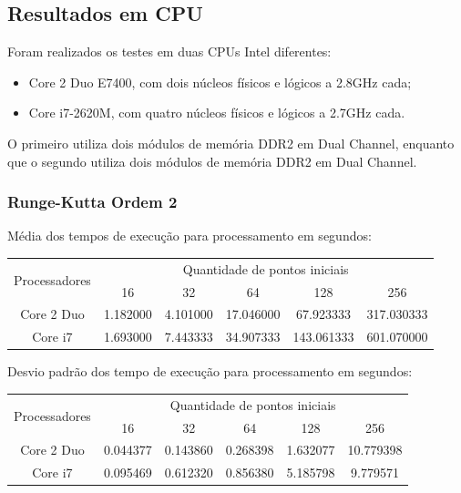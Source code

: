   \subsection{Resultados em CPU}
  Foram realizados os testes em duas CPUs Intel diferentes:
  \begin{itemize}
    \item Core 2 Duo E7400, com dois núcleos físicos e lógicos a 2.8GHz cada;
    \item Core i7-2620M, com quatro núcleos físicos e lógicos a 2.7GHz cada.
  \end{itemize}
  
  O primeiro utiliza dois módulos de memória DDR2 em Dual Channel, enquanto que o segundo utiliza dois módulos de memória DDR2 em Dual Channel.
    \subsubsection{Runge-Kutta Ordem 2}
    Média dos tempos de execução para processamento em segundos:\\
    \begin{tabular}{| c | c | c | c | c | c |}
      \hline
      \multirow{2}{*}{Processadores}& \multicolumn{5}{|c|}{Quantidade de pontos iniciais} \\ \cline{2-6}
      & 16 & 32 & 64 & 128 & 256 \\ \hline
      Core 2 Duo & 1.182000 & 4.101000 & 17.046000 & 67.923333 & 317.030333 \\ \hline
      Core i7 & 1.693000 & 7.443333 & 34.907333 & 143.061333 & 601.070000\\ \hline

      \hline
    \end{tabular}
    
    \hspace{1mm}\newline
    
    \noindent Desvio padrão dos tempo de execução para processamento em segundos:\\
    \begin{tabular}{| c | c | c | c | c | c |}
      \hline
      \multirow{2}{*}{Processadores}& \multicolumn{5}{|c|}{Quantidade de pontos iniciais} \\ \cline{2-6}
      & 16 & 32 & 64 & 128 & 256 \\ \hline
      Core 2 Duo & 0.044377 & 0.143860 & 0.268398 & 1.632077 & 10.779398 \\ \hline
      Core i7 &  0.095469 & 0.612320 & 0.856380 & 5.185798 & 9.779571 \\ \hline

      \hline
    \end{tabular}
    
